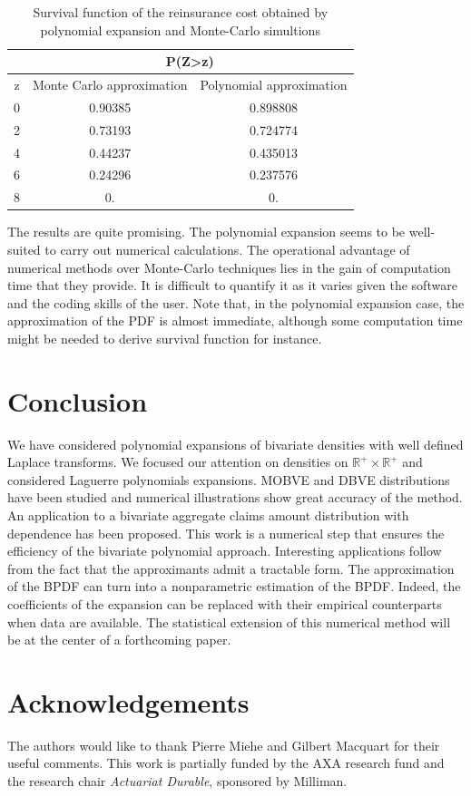 \begin{center}
\begin{table}[h]
\begin{center}
\begin{tabular}{|c||c|c|}
\hline
&\multicolumn{2}{c|}{P(Z>z)}\\
\hline
z&Monte Carlo approximation&Polynomial approximation\\
\hline\hline
0 & 0.90385 & 0.898808 \\
 2 & 0.73193 & 0.724774 \\
 4 & 0.44237 & 0.435013 \\
 6 & 0.24296 & 0.237576 \\
 8 & 0. & 0. \\
\hline
\end{tabular}
\end{center}
\caption{Survival function of the reinsurance cost obtained by polynomial  expansion and Monte-Carlo simultions}\label{ReinsuranceCostApplication}
\end{table}
\end{center}
The results are quite promising. The polynomial expansion seems to be well-suited to carry out numerical calculations.  The operational advantage of numerical methods over Monte-Carlo techniques lies in the gain of computation time that they provide. It is difficult to quantify it as it varies given the software and the coding skills of the user. Note that, in the polynomial expansion case, the approximation of the PDF is almost immediate, although some computation time might be needed to derive survival function for instance.       
\section{Conclusion}
We have considered polynomial expansions of bivariate densities with well defined Laplace transforms. We focused our attention on densities on $\mathbb{R}^{+}\times\mathbb{R}^{+}$ and considered Laguerre polynomials expansions. MOBVE and DBVE distributions have been studied and numerical illustrations show great accuracy of the method. An application to a bivariate aggregate claims amount distribution with dependence has been proposed. This work is a numerical step that ensures the efficiency of the bivariate polynomial approach. Interesting applications follow from the fact that the approximants admit a tractable form. The approximation of the BPDF can turn into a nonparametric estimation of the BPDF. Indeed, the coefficients of the expansion can be replaced with their empirical counterparts when data are available. The statistical extension of this numerical method will be at the center of a forthcoming paper.  
\section*{Acknowledgements}
The authors would like to thank Pierre Miehe and Gilbert Macquart for their useful comments. This work is partially funded by the AXA research fund and the research chair \textit{Actuariat Durable}, sponsored by Milliman.


